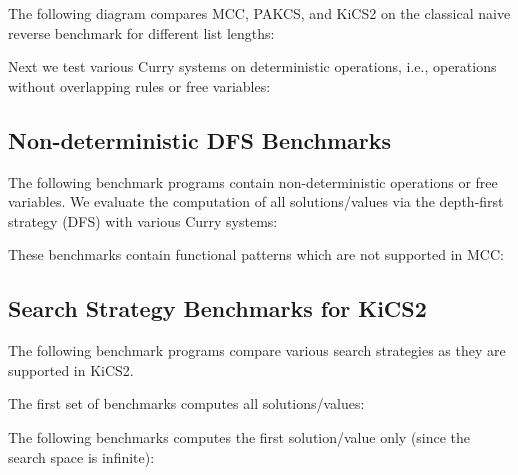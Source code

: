 \documentclass{scrartcl}
\begin{document}
The following diagram compares MCC, PAKCS, and KiCS2
on the classical naive reverse benchmark for different list lengths:

\begin{center}
\end{center}

Next we test various Curry systems on deterministic operations,
i.e., operations without overlapping rules or free variables:

\begin{center}
\end{center}


\subsection{Non-deterministic DFS Benchmarks}

The following benchmark programs contain non-deterministic operations
or free variables. We evaluate the computation of all
solutions/values via the depth-first strategy (DFS)
with various Curry systems:

\begin{center}
\end{center}

These benchmarks contain functional patterns which are not supported in MCC:

\begin{center}
\end{center}


\subsection{Search Strategy Benchmarks for KiCS2}

The following benchmark programs compare various search strategies
as they are supported in KiCS2.

The first set of benchmarks computes all solutions/values:

\begin{center}
\end{center}

The following benchmarks computes the first solution/value
only (since the search space is infinite):

\begin{center}
\end{center}
\end{document}
